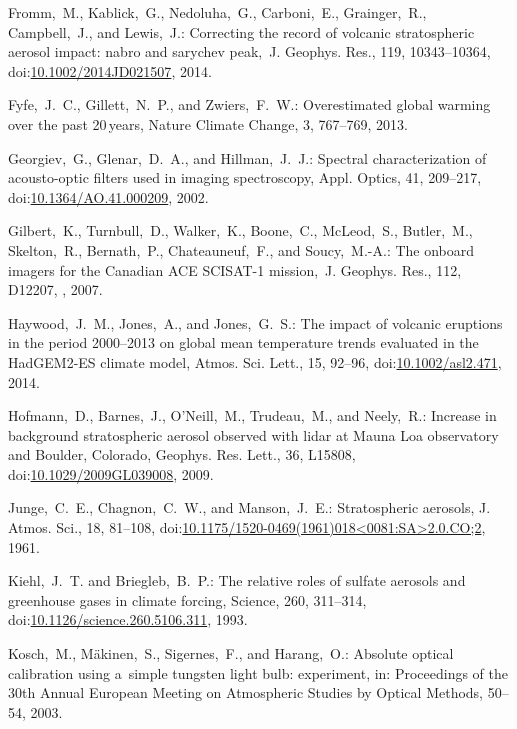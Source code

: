 \documentclass[amtd, online, hvmath]{copernicus}
\begin{document}
\begin{thebibliography}{99}
Fromm,~M., Kablick,~G., Nedoluha,~G., Carboni,~E., Grainger,~R.,
Campbell,~J., and Lewis,~J.: Correcting the record of volcanic stratospheric
aerosol impact: nabro and sarychev peak,~J. Geophys. Res., 119, 10343--10364,
doi:\href{http://dx.doi.org/10.1002/2014JD021507}{10.1002/2014JD021507},
2014.


Fyfe,~J.~C., Gillett,~N.~P., and Zwiers,~F.~W.: Overestimated global warming
over the past 20\,\unit{years}, Nature Climate Change, 3, 767--769, 2013.


Georgiev,~G., Glenar,~D.~A., and Hillman,~J.~J.: Spectral characterization of
acousto-optic filters used in imaging spectroscopy, Appl. Optics, 41,
209--217,
doi:\href{http://dx.doi.org/10.1364/AO.41.000209}{10.1364/AO.41.000209},
2002.


Gilbert,~K., Turnbull,~D., Walker,~K., Boone,~C., McLeod,~S., Butler,~M.,
Skelton,~R., Bernath,~P., Chateauneuf,~F., and Soucy,~M.-A.: The onboard
imagers for the Canadian ACE SCISAT-1 mission,~J. Geophys. Res., 112, D12207,
, 2007.


Haywood,~J.~M., Jones,~A., and Jones,~G.~S.: The impact of volcanic eruptions
in the period 2000--2013 on global mean temperature trends evaluated in the
HadGEM2-ES climate model, Atmos. Sci. Lett., 15, 92--96,
doi:\href{http://dx.doi.org/10.1002/asl2.471}{10.1002/asl2.471}, 2014.


Hofmann,~D., Barnes,~J., O'Neill,~M., Trudeau,~M., and Neely,~R.: Increase in
background stratospheric aerosol observed with lidar at Mauna Loa observatory
and Boulder, Colorado, Geophys. Res. Lett., 36, L15808,
doi:\href{http://dx.doi.org/10.1029/2009GL039008}{10.1029/2009GL039008},
2009.


Junge,~C.~E., Chagnon,~C.~W., and Manson,~J.~E.: Stratospheric aerosols, J.
Atmos. Sci., 18, 81--108,
doi:\href{http://dx.doi.org/10.1175/1520-0469(1961)018<0081:SA>2.0.CO;2}{10.1175/1520-0469(1961)018\textless0081:SA\textgreater2.0.CO;2},
1961.


Kiehl,~J.~T. and Briegleb,~B.~P.: The relative roles of sulfate aerosols and
greenhouse gases in climate forcing, Science, 260, 311--314,
doi:\href{http://dx.doi.org/10.1126/science.260.5106.311}{10.1126/science.260.5106.311},
1993.


Kosch,~M., M\"{a}kinen,~S., Sigernes,~F., and Harang,~O.: Absolute optical
calibration using a~simple tungsten light bulb: experiment, in: Proceedings
of the 30th Annual European Meeting on Atmospheric Studies by Optical
Methods, 50--54, 2003.



\end{thebibliography}
\end{document}
